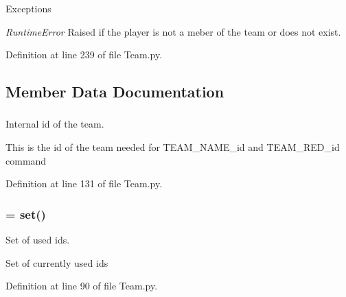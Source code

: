 \begin{DoxyExceptions}{Exceptions}
\item[{\em RuntimeError}]Raised if the player is not a meber of the team or does not exist. \end{DoxyExceptions}


Definition at line 239 of file Team.py.



\subsection{Member Data Documentation}
\hypertarget{class_team_1_1_team_a7ce63ee4a4004c0248fd10694054f459}{
\subsubsection[{\_\-\_\-id}]{}}
\label{class_team_1_1_team_a7ce63ee4a4004c0248fd10694054f459}


Internal id of the team. 

This is the id of the team needed for TEAM\_\-NAME\_\-id and TEAM\_\-RED\_\-id command 

Definition at line 131 of file Team.py.

\hypertarget{class_team_1_1_team_a262d61c33dc00a565e627421b95280e4}{
\subsubsection[{\_\-\_\-ids}]{ = set()}}
\label{class_team_1_1_team_a262d61c33dc00a565e627421b95280e4}


Set of used ids. 

Set of currently used ids 

Definition at line 90 of file Team.py.

\hypertarget{class_team_1_1_team_a5298a0b6a24b1c1245690a39b1b83d19}{
\subsubsection[{\_\-\_\-members}]{}}
\label{class_team_1_1_team_a5298a0b6a24b1c1245690a39b1b83d19}



